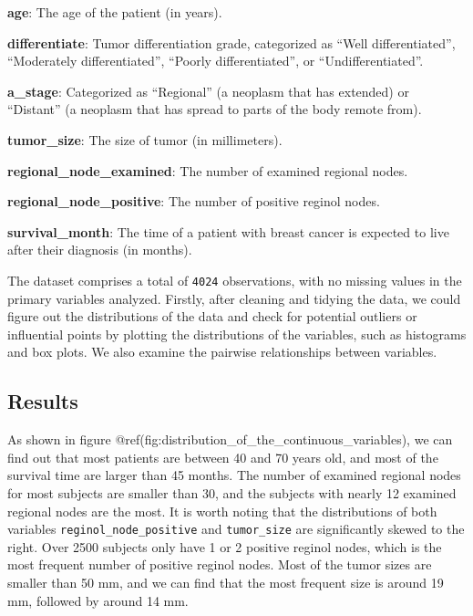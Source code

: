 \documentclass[
]{article}
\begin{document}
\textbf{age}: The age of the patient (in years).

\textbf{differentiate}: Tumor differentiation grade, categorized as
``Well differentiated'', ``Moderately differentiated'', ``Poorly
differentiated'', or ``Undifferentiated''.

\textbf{a\_stage}: Categorized as ``Regional'' (a neoplasm that has
extended) or ``Distant'' (a neoplasm that has spread to parts of the
body remote from).

\textbf{tumor\_size}: The size of tumor (in millimeters).

\textbf{regional\_node\_examined}: The number of examined regional
nodes.

\textbf{regional\_node\_positive}: The number of positive reginol nodes.

\textbf{survival\_month}: The time of a patient with breast cancer is
expected to live after their diagnosis (in months).

The dataset comprises a total of \texttt{4024} observations, with no
missing values in the primary variables analyzed. Firstly, after
cleaning and tidying the data, we could figure out the distributions of
the data and check for potential outliers or influential points by
plotting the distributions of the variables, such as histograms and box
plots. We also examine the pairwise relationships between variables.

\subsection{Results}\label{results}

As shown in figure
@ref(fig:distribution\_of\_the\_continuous\_variables), we can find out
that most patients are between 40 and 70 years old, and most of the
survival time are larger than 45 months. The number of examined regional
nodes for most subjects are smaller than 30, and the subjects with
nearly 12 examined regional nodes are the most. It is worth noting that
the distributions of both variables \texttt{reginol\_node\_positive} and
\texttt{tumor\_size} are significantly skewed to the right. Over 2500
subjects only have 1 or 2 positive reginol nodes, which is the most
frequent number of positive reginol nodes. Most of the tumor sizes are
smaller than 50 mm, and we can find that the most frequent size is
around 19 mm, followed by around 14 mm.
\end{document}
